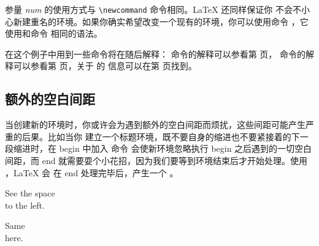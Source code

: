 参量 \emph{num} 的使用方式与 \verb|\newcommand| 命令相同。\LaTeX{} 还同样保证你
不会不小心新建重名的环境。如果你确实希望改变一个现有的环境，你可以使用命令
 ，它使用和命令  相同的语法。

在这个例子中用到一些命令将在随后解释： 命令的解释可以参看第 \pageref{sec:rule} 页，
 命令的解释可以参看第 \pageref{cmd:stretch} 页，关于  的
信息可以在第 \pageref{sec:hspace} 页找到。

\subsection{额外的空白间距}

当创建新的环境时，你或许会为遇到额外的空白间距而烦扰，这些间距可能产生严重的后果。比如当你
建立一个标题环境，既不要自身的缩进也不要紧接着的下一段缩进时，在 begin 中加入
命令  会使新环境忽略执行 begin 之后遇到的一切空白间距，而 end 
就需要耍个小花招，因为我们要等到环境结束后才开始处理。使用 ，\LaTeX{} 会
在 end 处理完毕后，产生一个 。

\begin{example}
\newenvironment{simple}%
 {\noindent}%
 {\par\noindent}

\begin{simple}
See the space\\to the left.
\end{simple}
Same\\here.
\end{example}

